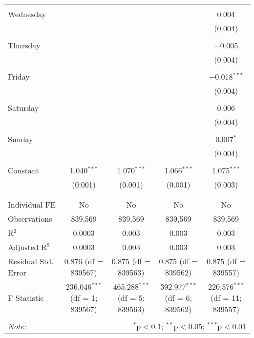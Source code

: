 \documentclass[
]{article}
\begin{document}
\begin{table}[!htbp]
{\begin{tabular}{@{\extracolsep{5pt}}lcccc}
  & & & & \\ 
 Wednesday &  &  &  & 0.004 \\ 
  &  &  &  & (0.004) \\ 
  & & & & \\ 
 Thursday &  &  &  & $-$0.005 \\ 
  &  &  &  & (0.004) \\ 
  & & & & \\ 
 Friday &  &  &  & $-$0.018$^{***}$ \\ 
  &  &  &  & (0.004) \\ 
  & & & & \\ 
 Saturday &  &  &  & 0.006 \\ 
  &  &  &  & (0.004) \\ 
  & & & & \\ 
 Sunday &  &  &  & 0.007$^{*}$ \\ 
  &  &  &  & (0.004) \\ 
  & & & & \\ 
 Constant & 1.040$^{***}$ & 1.070$^{***}$ & 1.066$^{***}$ & 1.075$^{***}$ \\ 
  & (0.001) & (0.001) & (0.001) & (0.003) \\ 
  & & & & \\ 
\hline \\[-1.8ex] 
Individual FE & No & No & No & No \\ 
Observations & 839,569 & 839,569 & 839,569 & 839,569 \\ 
R$^{2}$ & 0.0003 & 0.003 & 0.003 & 0.003 \\ 
Adjusted R$^{2}$ & 0.0003 & 0.003 & 0.003 & 0.003 \\ 
Residual Std. Error & 0.876 (df = 839567) & 0.875 (df = 839563) & 0.875 (df = 839562) & 0.875 (df = 839557) \\ 
F Statistic & 236.046$^{***}$ (df = 1; 839567) & 465.288$^{***}$ (df = 5; 839563) & 392.977$^{***}$ (df = 6; 839562) & 220.576$^{***}$ (df = 11; 839557) \\ 
\hline 
\hline \\[-1.8ex] 
\textit{Note:}  & \multicolumn{4}{r}{$^{*}$p$<$0.1; $^{**}$p$<$0.05; $^{***}$p$<$0.01} \\ 
\end{tabular}
} 
\end{table} 
\newpage
\end{document}

